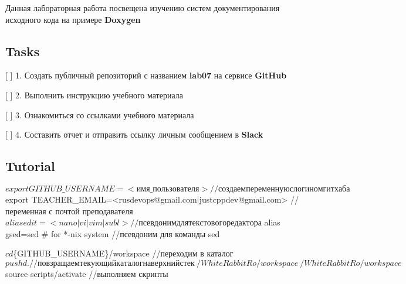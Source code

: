 Данная лабораторная работа посвещена изучению систем документирования исходного кода на примере {\bfseries Doxygen}




\subsection*{Tasks}


\begin{DoxyItemize}
\item \mbox{[} \mbox{]} 1. Создать публичный репозиторий с названием {\bfseries lab07} на сервисе {\bfseries Git\+Hub}
\item \mbox{[} \mbox{]} 2. Выполнить инструкцию учебного материала
\item \mbox{[} \mbox{]} 3. Ознакомиться со ссылками учебного материала
\item \mbox{[} \mbox{]} 4. Составить отчет и отправить ссылку личным сообщением в {\bfseries Slack}
\end{DoxyItemize}

\subsection*{Tutorial}


\begin{DoxyCode}
$ export GITHUB\_USERNAME=<имя\_пользователя> //создаем переменную с логином гитхаба
$ export TEACHER\_EMAIL=<rusdevops@gmail.com|justcppdev@gmail.com> //переменная с почтой преподавателя
$ alias edit=<nano|vi|vim|subl> //псевдоним для текстового редактора
$ alias gsed=sed # for *-nix system //псевдоним для команды sed
\end{DoxyCode}



\begin{DoxyCode}
$ cd $\{GITHUB\_USERNAME\}/workspace //переходим в каталог
$ pushd . //повзращаем текующий каталог на верхний стек
~/WhiteRabbitRo/workspace ~/WhiteRabbitRo/workspace

$ source scripts/activate //выполняем скрипты
\end{DoxyCode}



